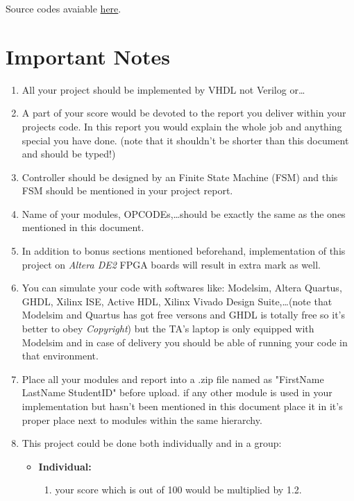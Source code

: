 \documentclass{report}
\begin{document}
        Source codes avaiable \href{https://github.com/AUT-CEIT/Arch101/blob/master/memory/memory.vhd}{here}.

\section{Important Notes}

    \begin{enumerate}
        \item
            All your project should be implemented by VHDL not Verilog or\ldots
        \item
            A part of your score would be devoted to the report you deliver within your projects code. In this report you would explain the whole job and anything special you have done. (note that it shouldn't be shorter than this document and should be typed!)
        \item
            Controller should be designed by an Finite State Machine (FSM) and this FSM should be mentioned in your project report.
        \item
            Name of your modules, OPCODEs,\ldots should be exactly the same as the ones mentioned in this document.
        \item
            In addition to bonus sections mentioned beforehand, implementation of this project on \textit{Altera DE2} FPGA boards will result in extra mark as well.
        \item
            You can simulate your code with softwares like: Modelsim, Altera Quartus, GHDL, Xilinx ISE, Active HDL, Xilinx Vivado Design Suite,\ldots (note that Modelsim and Quartus has got free versons and GHDL is totally free so it's better to obey \textit{Copyright}) but the TA's laptop is only equipped with Modelsim and in case of delivery you should be able of running your code in that environment. 
        \item
            Place all your modules and report into a .zip file named as "FirstName LastName StudentID" before upload. if any other module is used in your implementation but hasn't been mentioned in this document place it in it's proper place next to modules within the same hierarchy.
        \item
           This project could be done both individually and in a group:
            \begin{itemize}
                \item \textbf{Individual:}
                    \begin{enumerate}
                        \item 
                            your score which is out of 100 would be multiplied by 1.2.


\end{enumerate}
\end{itemize}
\end{enumerate}
\end{document}
